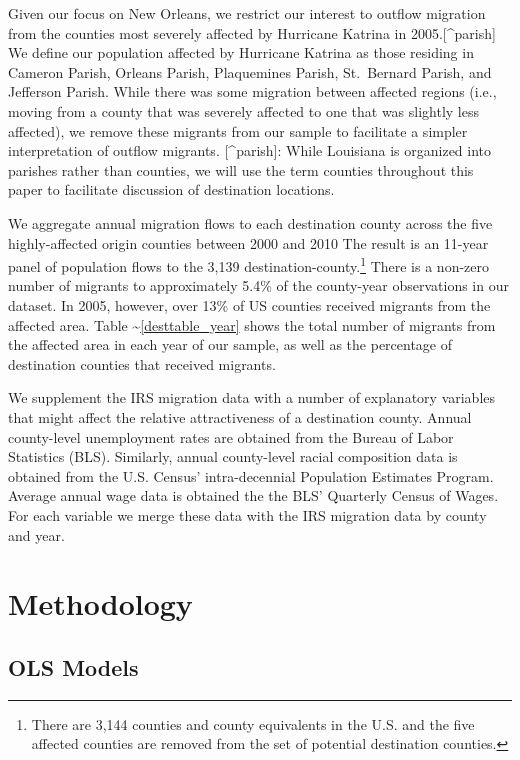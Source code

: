 \documentclass[]{article}
\let\rmarkdownfootnote\footnote%
\def\footnote{\protect\rmarkdownfootnote}
\begin{document}
Given our focus on New Orleans, we restrict our interest to outflow
migration from the counties most severely affected by Hurricane Katrina
in 2005.{[}\^{}parish{]} We define our population affected by Hurricane
Katrina as those residing in Cameron Parish, Orleans Parish, Plaquemines
Parish, St.~Bernard Parish, and Jefferson Parish. While there was some
migration between affected regions (i.e., moving from a county that was
severely affected to one that was slightly less affected), we remove
these migrants from our sample to facilitate a simpler interpretation of
outflow migrants. {[}\^{}parish{]}: While Louisiana is organized into
parishes rather than counties, we will use the term counties throughout
this paper to facilitate discussion of destination locations.

We aggregate annual migration flows to each destination county across
the five highly-affected origin counties between 2000 and 2010 The
result is an 11-year panel of population flows to the 3,139
destination-county.\footnote{There are 3,144 counties and county
  equivalents in the U.S. and the five affected counties are removed
  from the set of potential destination counties.} There is a non-zero
number of migrants to approximately 5.4\% of the county-year
observations in our dataset. In 2005, however, over 13\% of US counties
received migrants from the affected area. Table
\textasciitilde{}\ref{desttable_year} shows the total number of migrants
from the affected area in each year of our sample, as well as the
percentage of destination counties that received migrants.

We supplement the IRS migration data with a number of explanatory
variables that might affect the relative attractiveness of a destination
county. Annual county-level unemployment rates are obtained from the
Bureau of Labor Statistics (BLS). Similarly, annual county-level racial
composition data is obtained from the U.S. Census' intra-decennial
Population Estimates Program. Average annual wage data is obtained the
the BLS' Quarterly Census of Wages. For each variable we merge these
data with the IRS migration data by county and year.

\section{\texorpdfstring{Methodology
\label{sec:meth}}{Methodology }}\label{methodology}

\subsection{OLS Models}\label{ols-models}
\end{document}
